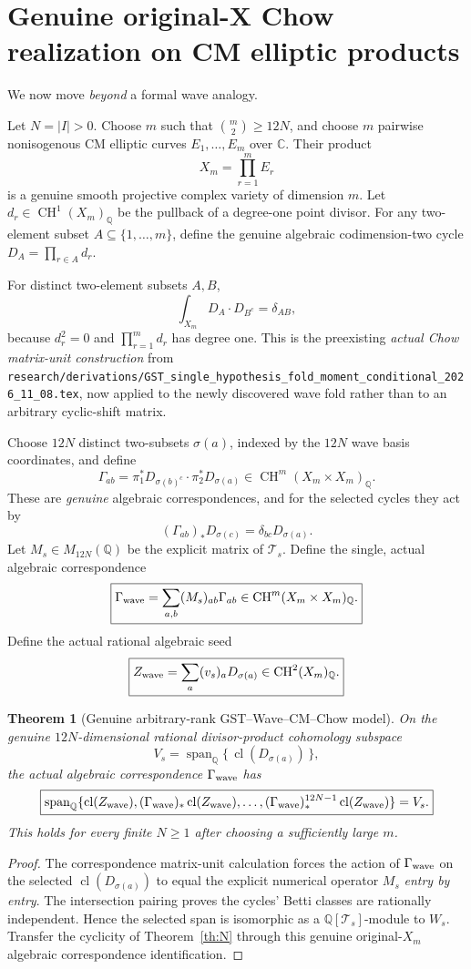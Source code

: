 \documentclass[11pt]{article}
\newtheorem{theorem}{Theorem}
\newcommand{\QQ}{\mathbb Q}
\newcommand{\CC}{\mathbb C}
\newcommand{\CH}{\operatorname{CH}}
\newcommand{\cl}{\operatorname{cl}}
\begin{document}
\section{Genuine original-X Chow realization on CM elliptic products}\label{sec:Chow}

We now move \emph{beyond} a formal wave analogy.

Let \(N=|I|>0\). Choose \(m\) such that \(\binom m2\ge 12N\), and choose
\(m\) pairwise nonisogenous CM elliptic curves \(E_1,\ldots,E_m\) over \(\CC\).
Their product
\[
 \boxed{X_m=\prod_{r=1}^m E_r}
\]
is a genuine smooth projective complex variety of dimension \(m\).
Let \(d_r\in\CH^1(X_m)_\QQ\) be the pullback of a degree-one point divisor.
For any two-element subset \(A\subseteq\{1,\ldots,m\}\), define the genuine algebraic codimension-two cycle
\(D_A=\prod_{r\in A}d_r\).

For distinct two-element subsets \(A,B\),
\[
 \boxed{\int_{X_m}D_A\cdot D_{B^c}=\delta_{AB},}
\]
because \(d_r^2=0\) and \(\prod_{r=1}^m d_r\) has degree one. This is the preexisting \emph{actual Chow matrix-unit construction} from
\texttt{research/derivations/GST\_single\_hypothesis\_fold\_moment\_conditional\_2026\_11\_08.tex}, now applied to the newly discovered wave fold rather than to an arbitrary cyclic-shift matrix.

Choose \(12N\) distinct two-subsets \(\sigma(a)\), indexed by the \(12N\) wave basis coordinates, and define
\[
 \Gamma_{ab}
 =\pi_1^*D_{\sigma(b)^c}\cdot\pi_2^*D_{\sigma(a)}
 \in\CH^m(X_m\times X_m)_\QQ .
\]
These are \emph{genuine} algebraic correspondences, and for the selected cycles they act by
\[
 (\Gamma_{ab})_*D_{\sigma(c)}=\delta_{bc}D_{\sigma(a)}.
\]
Let \(M_s\in M_{12N}(\QQ)\) be the explicit matrix of \(\mathcal T_s\).
Define the single, actual algebraic correspondence
\[
 \boxed{\Gamma_{\rm wave}
 =\sum_{a,b}(M_s)_{ab}\Gamma_{ab}
 \in\CH^m(X_m\times X_m)_\QQ .}
\]
Define the actual rational algebraic seed
\[
 \boxed{Z_{\rm wave}
 =\sum_{a}(v_s)_a D_{\sigma(a)}
 \in\CH^2(X_m)_\QQ.}
\]

\begin{theorem}[Genuine arbitrary-rank GST--Wave--CM--Chow model]
On the genuine \(12N\)-dimensional rational divisor-product cohomology subspace
\[
 V_s=\operatorname{span}_\QQ\{\,\cl(D_{\sigma(a)})\,\},
\]
the actual algebraic correspondence \(\Gamma_{\rm wave}\) has
\[
 \boxed{\operatorname{span}_\QQ
 \{\cl(Z_{\rm wave}),(\Gamma_{\rm wave})_*\cl(Z_{\rm wave}),
 \ldots,(\Gamma_{\rm wave})_*^{12N-1}\cl(Z_{\rm wave})\}=V_s .}
\]
This holds for \emph{every} finite \(N\ge1\) after choosing a sufficiently large \(m\).
\end{theorem}
\begin{proof}
The correspondence matrix-unit calculation forces the action of
\(\Gamma_{\rm wave}\) on the selected \(\cl(D_{\sigma(a)})\) to equal the explicit numerical operator \(M_s\) \emph{entry by entry}. The intersection pairing proves the cycles' Betti classes are rationally independent. Hence the selected span is isomorphic as a \(\QQ[\mathcal T_s]\)-module to \(W_s\). Transfer the cyclicity of Theorem~\ref{th:N} through this genuine original-\(X_m\) algebraic correspondence identification.
\end{proof}
\end{document}
